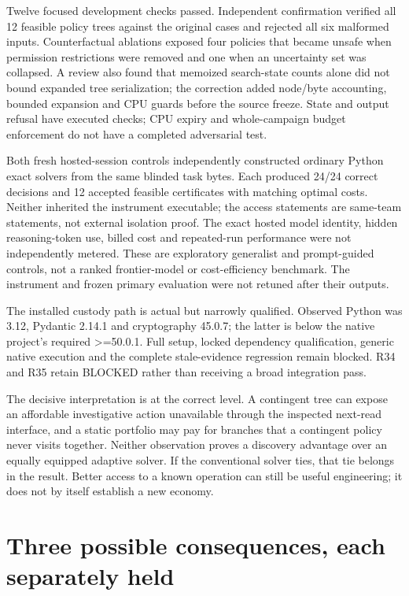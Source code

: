 \documentclass[10pt,letterpaper]{article}
\begin{document}
Twelve focused development checks passed. Independent confirmation
verified all 12 feasible policy trees against the original cases and
rejected all six malformed inputs. Counterfactual ablations exposed four
policies that became unsafe when permission restrictions were removed
and one when an uncertainty set was collapsed. A review also found that
memoized search-state counts alone did not bound expanded tree
serialization; the correction added node/byte accounting, bounded
expansion and CPU guards before the source freeze. State and output
refusal have executed checks; CPU expiry and whole-campaign budget
enforcement do not have a completed adversarial test.

Both fresh hosted-session controls independently constructed ordinary
Python exact solvers from the same blinded task bytes. Each produced
24/24 correct decisions and 12 accepted feasible certificates with
matching optimal costs. Neither inherited the instrument executable; the
access statements are same-team statements, not external isolation
proof. The exact hosted model identity, hidden reasoning-token use,
billed cost and repeated-run performance were not independently metered.
These are exploratory generalist and prompt-guided controls, not a
ranked frontier-model or cost-efficiency benchmark. The instrument and
frozen primary evaluation were not retuned after their outputs.

The installed custody path is actual but narrowly qualified. Observed
Python was 3.12, Pydantic 2.14.1 and cryptography 45.0.7; the latter is
below the native project's required \textgreater=50.0.1. Full setup,
locked dependency qualification, generic native execution and the
complete stale-evidence regression remain blocked. R34 and R35 retain
BLOCKED rather than receiving a broad integration pass.

The decisive interpretation is at the correct level. A contingent tree
can expose an affordable investigative action unavailable through the
inspected next-read interface, and a static portfolio may pay for
branches that a contingent policy never visits together. Neither
observation proves a discovery advantage over an equally equipped
adaptive solver. If the conventional solver ties, that tie belongs in
the result. Better access to a known operation can still be useful
engineering; it does not by itself establish a new economy.

\newpage

\hypertarget{three-possible-consequences-each-separately-held}{%
\section{Three possible consequences, each separately
held}\label{three-possible-consequences-each-separately-held}}
\end{document}
